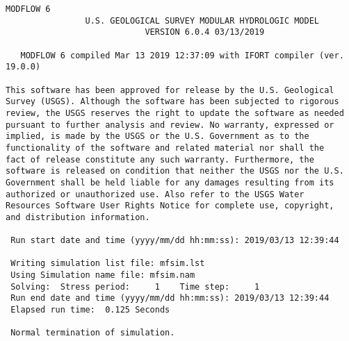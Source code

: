 {\small
\begin{lstlisting}[style=modeloutput]
                                   MODFLOW 6
                U.S. GEOLOGICAL SURVEY MODULAR HYDROLOGIC MODEL
                            VERSION 6.0.4 03/13/2019

   MODFLOW 6 compiled Mar 13 2019 12:37:09 with IFORT compiler (ver. 19.0.0)

This software has been approved for release by the U.S. Geological
Survey (USGS). Although the software has been subjected to rigorous
review, the USGS reserves the right to update the software as needed
pursuant to further analysis and review. No warranty, expressed or
implied, is made by the USGS or the U.S. Government as to the
functionality of the software and related material nor shall the
fact of release constitute any such warranty. Furthermore, the
software is released on condition that neither the USGS nor the U.S.
Government shall be held liable for any damages resulting from its
authorized or unauthorized use. Also refer to the USGS Water
Resources Software User Rights Notice for complete use, copyright,
and distribution information.

 Run start date and time (yyyy/mm/dd hh:mm:ss): 2019/03/13 12:39:44

 Writing simulation list file: mfsim.lst
 Using Simulation name file: mfsim.nam
 Solving:  Stress period:     1    Time step:     1
 Run end date and time (yyyy/mm/dd hh:mm:ss): 2019/03/13 12:39:44
 Elapsed run time:  0.125 Seconds

 Normal termination of simulation.

\end{lstlisting}
}
